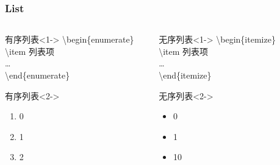 \begin{frame}
    \frametitle{List}
    \begin{columns}
        \begin{column}{0.45\textwidth}
            \begin{block}{有序列表}<1->
                \textbackslash begin\{enumerate\} \\
                \quad \textbackslash item 列表项 \\
                \quad \dots \\
                \textbackslash end\{enumerate\}
            \end{block}
            \begin{block}{有序列表}<2->
                \begin{enumerate}
                    \item 0
                    \item 1
                    \item 2
                \end{enumerate}
            \end{block}
        \end{column}
        \begin{column}{0.45\textwidth}
            \begin{block}{无序列表}<1->
                \textbackslash begin\{itemize\} \\
                \quad \textbackslash item 列表项 \\
                \quad \dots \\
                \textbackslash end\{itemize\}
            \end{block}
            \begin{block}{无序列表}<2->
                \begin{itemize}
                    \item 0
                    \item 1
                    \item 10
                \end{itemize}
            \end{block}
        \end{column}
        \begin{column}{0.10\textwidth}
        \end{column}
    \end{columns}
\end{frame}
